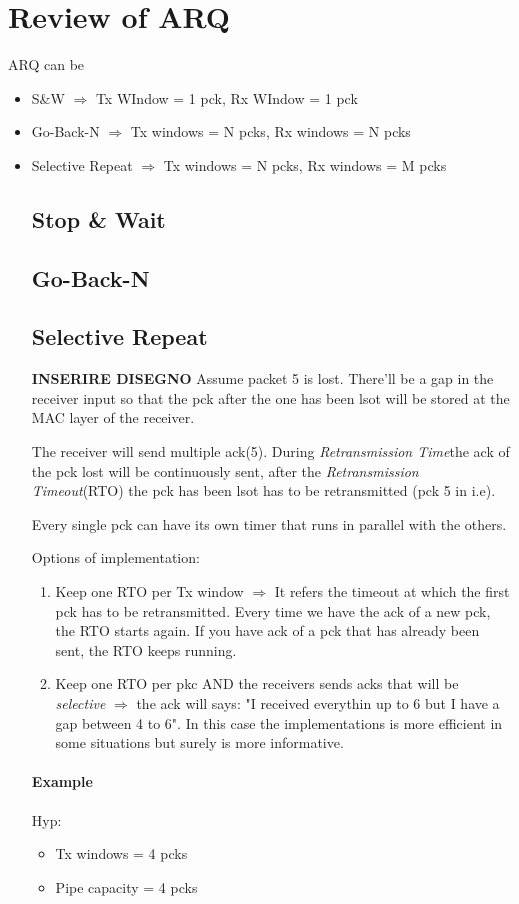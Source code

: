 \section{Review of ARQ}
ARQ can be
\begin{itemize}
\item S&W $\Rightarrow$ Tx WIndow = 1 pck, Rx WIndow = 1 pck
\item Go-Back-N $\Rightarrow$ Tx windows = N pcks, Rx windows = N pcks
\item Selective Repeat $\Rightarrow$ Tx windows = N pcks, Rx windows = M pcks
\subsection{Stop & Wait}
\subsection{Go-Back-N}
\subsection{Selective Repeat}
\textbf{INSERIRE DISEGNO}
Assume packet 5 is lost. There'll be a gap in the receiver input so that the pck after the one has been lsot will be stored at the MAC layer of the receiver.

The receiver will send multiple ack(5). During \emph{Retransmission Time}the ack of the pck lost will be continuously sent, after the \emph{Retransmission Timeout}(RTO) the pck has been lsot has to be retransmitted (pck 5 in i.e).

Every single pck can have its own timer that runs in parallel with the others. 

Options of implementation:
\begin{enumerate}
\item Keep one RTO per Tx window $\Rightarrow$ It refers the timeout at which the first pck has to be retransmitted. 
Every time we have the ack of a new pck, the RTO starts again. 
If you have ack of a pck that has already been sent, the RTO keeps running.
\item Keep one RTO per pkc AND the receivers sends acks that will be \emph{selective} $\Rightarrow$ the ack will says: "I received everythin up to 6 but I have a gap between 4 to 6". In this case the implementations is more efficient in some situations but surely is more informative.   
\end{enumerate}

\paragraph{Example}
Hyp:
\begin{itemize}
\item Tx windows = 4 pcks
\item Pipe capacity = 4 pcks
\end{itemize}


\end{itemize}
